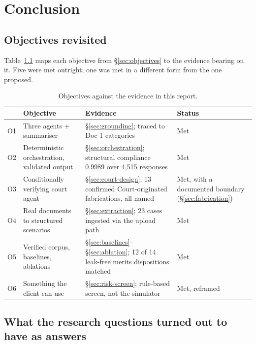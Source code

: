 \chapter{Conclusion}
\label{ch:conclusion}

\section{Objectives revisited}

Table~\ref{tab:objectives} maps each objective from \S\ref{sec:objectives} to the
evidence bearing on it. Five were met outright; one was met in a different form
from the one proposed.

\begin{table}[htbp]
\centering
\footnotesize
\caption[Objectives against evidence]{Objectives against the evidence in this
report.}
\label{tab:objectives}
\begin{tabularx}{\textwidth}{@{}c>{\raggedright\arraybackslash}p{5.0cm}X>{\raggedright\arraybackslash}p{1.7cm}@{}}
\toprule
& \textbf{Objective} & \textbf{Evidence} & \textbf{Status} \\
\midrule
O1 & Three agents + summariser & \S\ref{sec:grounding};
 traced to Doc 1 categories & Met \\
O2 & Deterministic orchestration, validated output & \S\ref{sec:orchestration};
 structural compliance 0.9989 over 4{,}515 responses & Met \\
O3 & Conditionally verifying court agent & \S\ref{sec:court-design};
 13 confirmed Court-originated fabrications, all named & Met, with a
 documented boundary (\S\ref{sec:fabrication}) \\
O4 & Real documents to structured scenarios & \S\ref{sec:extraction};
 23 cases ingested via the upload path & Met \\
O5 & Verified corpus, baselines, ablations & \S\ref{sec:baselines}--\S\ref{sec:ablation};
 12 of 14 leak-free merits dispositions matched & Met \\
O6 & Something the client can use & \S\ref{sec:risk-screen};
 rule-based screen, not the simulator & Met, reframed \\
\bottomrule
\end{tabularx}
\end{table}

\section{What the research questions turned out to have as answers}


